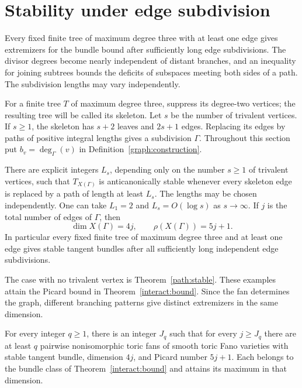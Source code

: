 \section{Stability under edge subdivision}\label{sec:subdivided}

Every fixed finite tree of maximum degree three with at least one edge
gives extremizers for the bundle bound after sufficiently long edge
subdivisions. The divisor
degrees become nearly independent of distant branches, and an inequality
for joining subtrees bounds the deficits of subspaces meeting both
sides of a path. The subdivision lengths may vary independently.

For a finite tree $T$ of maximum degree three, suppress its degree-two
vertices; the resulting tree will be called its skeleton. Let $s$ be the
number of trivalent vertices. If $s\ge1$, the skeleton has $s+2$ leaves
and $2s+1$ edges. Replacing its edges by paths of positive integral lengths
gives a subdivision $\Gamma$. Throughout this section put
$b_v=\deg_\Gamma(v)$ in Definition~\ref{graph:construction}.

\begin{theorem}\label{tree:stable}
There are explicit integers $L_s$, depending only on the number $s\ge1$
of trivalent vertices, such that $T_{X(\Gamma)}$ is anticanonically stable
whenever every skeleton edge is replaced by a path of length at least
$L_s$. The lengths may be chosen independently. One can take $L_1=2$
and $L_s=O(\log s)$ as $s\to\infty$.
If $j$ is the total number of edges of $\Gamma$, then
\[
 \dim X(\Gamma)=4j,\qquad \rho(X(\Gamma))=5j+1.
\]
In particular every fixed finite tree of maximum degree three and at
least one edge gives stable tangent bundles after all sufficiently long
independent edge subdivisions.
\end{theorem}

The case with no trivalent vertex is Theorem~\ref{path:stable}.
These examples attain the Picard bound in Theorem~\ref{interact:bound}.
Since the fan determines the graph, different branching patterns give
distinct extremizers in the same dimension.

\begin{corollary}\label{tree:abundance}
For every integer $q\ge1$, there is an integer $J_q$ such that for every
$j\ge J_q$ there are at least $q$ pairwise nonisomorphic toric fans of
smooth toric Fano varieties with stable tangent bundle, dimension $4j$,
and Picard number $5j+1$. Each belongs to the bundle class of
Theorem~\ref{interact:bound} and attains its maximum in that dimension.
\end{corollary}

